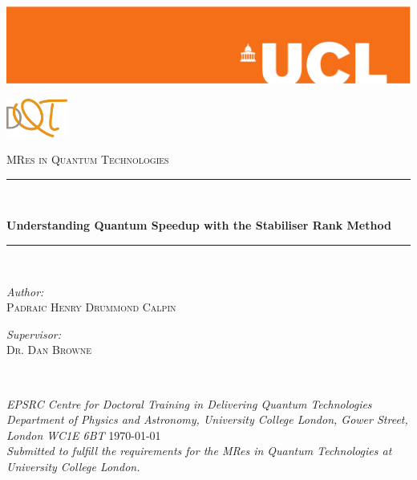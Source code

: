 \newcommand{\HRule}{\rule{\linewidth}{0.5mm}}
\begin{titlepage}
\hspace*{-2.5cm}\includegraphics[width=1.2\hsize]{Figures/orange-eps-converted-to}
\\[3cm]
\begin{flushright}
	\includegraphics[width=0.15\textwidth]{Figures/DQT-LOGO.png}
\end{flushright}
\vspace{-15pt}
\textsc{\large MRes in Quantum Technologies}
\\[1cm]
\HRule \\[0.5cm]
\begin{center}
	\textsf{\huge \bfseries Understanding Quantum Speedup with the Stabiliser Rank Method} \\
\end{center}
\HRule \\[1cm]
\begin{minipage}{0.5\textwidth}
	\begin{flushleft}
		\emph{Author:} \\
		\textsc{Padraic Henry Drummond Calpin} \\[0.4cm]	
	\end{flushleft}
\end{minipage}
\begin{minipage}{0.5\textwidth}
	\begin{flushright}
		\emph{Supervisor:} \\
		\textsc{Dr. Dan Browne} \\[0.4cm]
	\end{flushright}
\end{minipage} \\[1cm]
\begin{center}
	\emph{EPSRC Centre for Doctoral Training in Delivering Quantum Technologies\\ Department of Physics and Astronomy, University College London, Gower Street, London WC1E 6BT}
\vfill
\large \today\\[1.5cm]
	\emph{Submitted to fulfill the requirements for the MRes in Quantum Technologies at University College London.}
\end{center}
\end{titlepage}